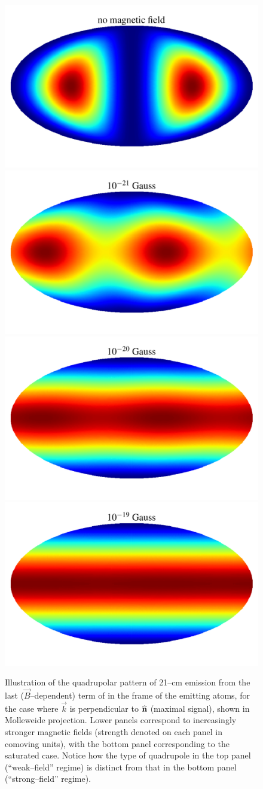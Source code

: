 \begin{figure}
\centering
\includegraphics[width=.35\textwidth,keepaspectratio=true]{hp_B_0e+00G.pdf}
\includegraphics[width=.35\textwidth,keepaspectratio=true]{hp_B_1e-18G.pdf}
\includegraphics[width=.35\textwidth,keepaspectratio=true]{hp_B_1e-17G.pdf}
\includegraphics[width=.35\textwidth,keepaspectratio=true]{hp_B_1e-16G.pdf}
\caption{Illustration of the quadrupolar pattern of 21--cm emission from the last ($\vec B$--dependent) term of \eq{\ref{eq:tbsoln}} in the frame of the emitting atoms, for the case where $\vec k$ is perpendicular to ${\bf{\widehat n}}$ (maximal signal), shown in Molleweide projection. Lower panels correspond to increasingly stronger magnetic fields (strength denoted on each panel in comoving units), with the bottom panel corresponding to the saturated case. Notice how the type of quadrupole in the top panel (``weak--field'' regime) is distinct from that in the bottom panel  (``strong--field'' regime). \label{fig:hp}}
\end{figure}

